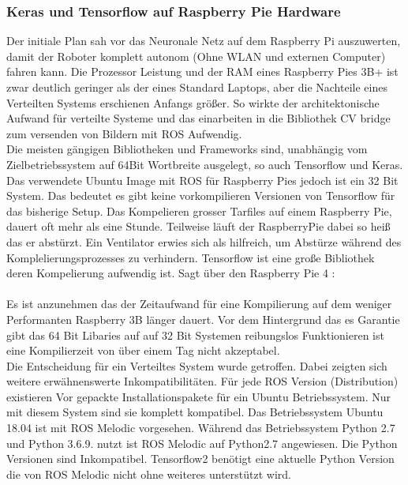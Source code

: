 \documentclass[conference]{IEEEtran}
\begin{document}
\subsubsection{Keras und Tensorflow auf Raspberry Pie Hardware}
Der initiale Plan sah vor das Neuronale Netz auf dem Raspberry Pi auszuwerten, damit der Roboter komplett autonom (Ohne WLAN und externen Computer) fahren kann. Die Prozessor Leistung und der RAM eines Raspberry Pies 3B+ ist zwar deutlich geringer als der eines Standard Laptops, aber die Nachteile eines Verteilten Systems erschienen Anfangs größer. So wirkte der architektonische Aufwand für  verteilte Systeme und  das einarbeiten in die Bibliothek CV bridge zum versenden von Bildern mit ROS Aufwendig. \\
Die meisten gängigen Bibliotheken und Frameworks sind, unabhängig vom Zielbetriebssystem auf 64Bit Wortbreite ausgelegt, so auch Tensorflow und Keras.  Das verwendete Ubuntu Image mit ROS für Raspberry Pies jedoch ist ein 32 Bit System. Das bedeutet es gibt keine vorkompilieren Versionen von Tensorflow für das bisherige Setup. Das Kompelieren grosser Tarfiles auf einem Raspberry Pie, dauert oft mehr als eine Stunde. Teilweise läuft der RaspberryPie dabei so heiß das er abstürzt. Ein Ventilator erwies sich als hilfreich, um  Abstürze während des Komplelierungsprozesses zu verhindern.  Tensorflow ist eine große Bibliothek deren Kompelierung aufwendig ist. 
Sagt über den Raspberry Pie 4   : \\
 \\
Es ist  anzunehmen das der Zeitaufwand für eine Kompilierung auf dem  weniger Performanten Raspberry 3B länger dauert. Vor dem Hintergrund das es  Garantie gibt das 64 Bit Libaries auf auf 32 Bit Systemen reibungslos Funktionieren ist eine Kompilierzeit von über einem Tag nicht akzeptabel. \\

Die Entscheidung für ein Verteiltes System wurde getroffen. Dabei zeigten sich weitere erwähnenswerte Inkompatibilitäten. Für jede ROS Version (Distribution) existieren Vor gepackte Installationspakete für ein Ubuntu Betriebssystem. Nur mit diesem System sind sie komplett kompatibel. Das Betriebssystem Ubuntu 18.04  ist mit ROS Melodic vorgesehen. Während das Betriebssystem Python 2.7 und Python 3.6.9.  nutzt ist ROS Melodic auf Python2.7 angewiesen. Die Python Versionen sind Inkompatibel. Tensorflow2 benötigt eine aktuelle Python Version die von ROS Melodic nicht ohne weiteres  unterstützt wird. \\
\end{document}
